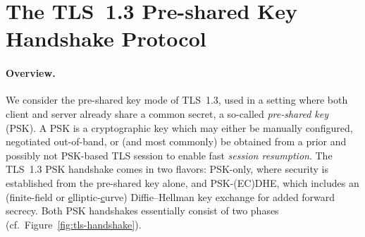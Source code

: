 \section{The TLS~1.3 Pre-shared Key Handshake Protocol}
\label{sec:tls13-psk-protocol}


\paragraph{Overview.}
We consider the pre-shared key mode of TLS~1.3, used in a setting where both client and server already share a common secret, a so-called \emph{pre-shared key} (PSK).
A PSK is a cryptographic key which may either be manually configured, negotiated out-of-band, or (and most commonly) be obtained from a prior and possibly not PSK-based TLS session to enable fast \emph{session resumption}.
The TLS~1.3 PSK handshake comes in two flavors:
PSK-only, where security is established from the pre-shared key alone,
and PSK-(EC)DHE, which includes an (finite-field or \underline{e}lliptic-\underline{c}urve) Diffie--Hellman key exchange for added forward secrecy.
Both PSK handshakes essentially consist of two phases (cf.\ Figure~\ref{fig:tls-handshake}). 

